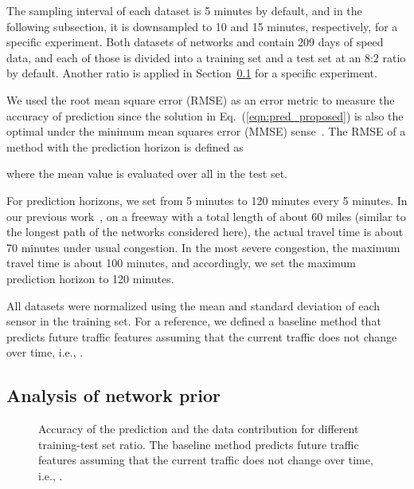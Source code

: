 \documentclass[journal]{IEEEtran}
\begin{document}
The sampling interval of each dataset is 5 minutes by default, and in the following subsection, it is downsampled to 10 and 15 minutes, respectively, for a specific experiment.
Both datasets of networks  and  contain 209 days of speed data, and each of those is divided into a training set and a test set at an 8:2 ratio by default.
Another ratio is applied in Section~\ref{sec:network_prior} for a specific experiment.



We used the root mean square error (RMSE) as an error metric to measure the accuracy of prediction since the solution in Eq.~(\ref{eqn:pred_proposed}) is also the optimal under the minimum mean squares error (MMSE) sense~\cite{kwak2020travel}.
The RMSE of a method with the prediction horizon  is defined as

where the mean value is evaluated over all  in the test set.


For prediction horizons, we set from 5 minutes to 120 minutes every 5 minutes. In our previous work~\cite{kwak2020travel}, on a freeway with a total length of about 60 miles (similar to the longest path of the networks considered here), the actual travel time is about 70 minutes under usual congestion. In the most severe congestion, the maximum travel time is about 100 minutes, and accordingly, we set the maximum prediction horizon to 120 minutes.


All datasets were normalized using the mean and standard deviation of each sensor in the training set.
For a reference, we defined a baseline method that predicts future traffic features assuming that the current traffic does not change over time, i.e., .



\subsection{Analysis of network prior}\label{sec:network_prior}
\begin{figure*}[!ht]
   \centering
   \hfill
   \hfill
   \hfill
   \hfill
   \caption{Accuracy of the prediction and the data contribution for different training-test set ratio. 
   The baseline method predicts future traffic features assuming that the current traffic does not change over time, i.e., .
   }\label{fig:rmse_performance_prior_data}
\end{figure*}
\end{document}
